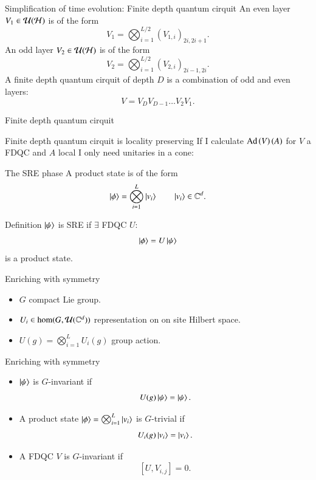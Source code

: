 \documentclass{beamer}
\begin{document}
\begin{frame}{Simplification of time evolution: Finite depth quantum cirquit}
	An even layer $V_1\in\mathcal{U}(\mathcal{H})$ is of the form
	\[V_1=\bigotimes_{i=1}^{L/2}(V_{1,i})_{2i,2i+1}.\]
	\pause
	An odd layer $V_2\in\mathcal{U}(\mathcal{H})$ is of the form
	\[V_2=\bigotimes_{i=1}^{L/2}(V_{2,i})_{2i-1,2i}.\]
	\pause
	A finite depth quantum cirquit of depth $D$ is a combination of odd and even layers:
	\[V=V_D V_{D-1}\ldots V_2V_1.\]
\end{frame}

\begin{frame}{Finite depth quantum cirquit}
	\begin{center}
		
	\end{center}
\end{frame}

\begin{frame}{Finite depth quantum cirquit is locality preserving}
	If I calculate $\textrm{Ad}\left(V\right)(A)$ for $V$ a FDQC and $A$ local I only need unitaries in a cone:
	\begin{center}
		\scalebox{0.75}{
			
		}
	\end{center}
\end{frame}

\begin{frame}{The SRE phase}
	A product state is of the form
	\[\ket{\phi}=\bigotimes_{i=1}^L\ket{v_i}\qquad \ket{v_i}\in\mathbb{C}^d.\]
	\pause
	\begin{block}{Definition}
		$\ket{\psi}$ is SRE if $\exists$ FDQC $U$:
		\[\ket{\phi}=U\ket{\psi}\]
		is a product state.
	\end{block}
\end{frame}

\begin{frame}{Enriching with symmetry}
	\begin{center}
		\scalebox{0.75}{
		
		}
	\end{center}
	\begin{itemize}
		\item $G$ compact Lie group.
		\item $U_i\in\hom(G,\mathcal{U}(\mathbb{C}^d))$ representation on on site Hilbert space.
		\item $U(g)=\bigotimes_{i=1}^{L}U_i(g)$ group action.
	\end{itemize}
\end{frame}

\begin{frame}{Enriching with symmetry}
	\begin{itemize}
		\item $\ket{\psi}$ is $G$-invariant if
		\[U(g)\ket{\psi}=\ket{\psi}.\]
		\item A product state $\ket{\phi}=\bigotimes_{i=1}^{L}\ket{v_i}$ is $G$-trivial if
		\[U_i(g)\ket{v_i}=\ket{v_i}.\]
		\item A FDQC $V$ is $G$-invariant if
		\[[U,V_{i,j}]=0.\]
	\end{itemize}
\end{frame}
\end{document}
